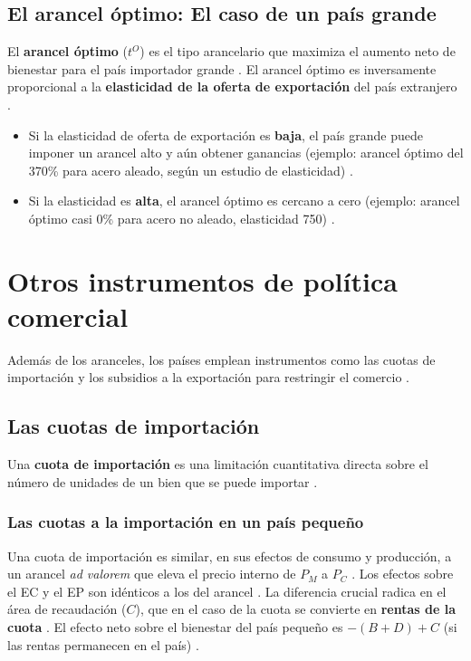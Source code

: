 \subsection{El arancel óptimo: El caso de un país grande}
El \textbf{arancel óptimo} ($t^O$) es el tipo arancelario que maximiza el aumento neto de bienestar para el país importador grande . El arancel óptimo es inversamente proporcional a la \textbf{elasticidad de la oferta de exportación} del país extranjero .
\begin{itemize}
    \item Si la elasticidad de oferta de exportación es \textbf{baja}, el país grande puede imponer un arancel alto y aún obtener ganancias (ejemplo: arancel óptimo del 370\% para acero aleado, según un estudio de elasticidad) .
    \item Si la elasticidad es \textbf{alta}, el arancel óptimo es cercano a cero (ejemplo: arancel óptimo casi 0\% para acero no aleado, elasticidad 750) .
\end{itemize}

\section{Otros instrumentos de política comercial}
Además de los aranceles, los países emplean instrumentos como las cuotas de importación y los subsidios a la exportación para restringir el comercio .

\subsection{Las cuotas de importación}
Una \textbf{cuota de importación} es una limitación cuantitativa directa sobre el número de unidades de un bien que se puede importar .

\subsubsection{Las cuotas a la importación en un país pequeño}
Una cuota de importación es similar, en sus efectos de consumo y producción, a un arancel \textit{ad valorem} que eleva el precio interno de $P_M$ a $P_C$ . Los efectos sobre el EC y el EP son idénticos a los del arancel . La diferencia crucial radica en el área de recaudación ($C$), que en el caso de la cuota se convierte en \textbf{rentas de la cuota} . El efecto neto sobre el bienestar del país pequeño es $-(B+D) + C$ (si las rentas permanecen en el país) .

